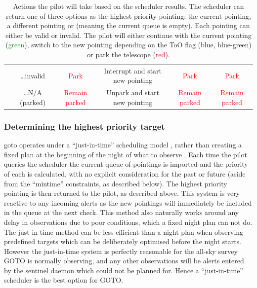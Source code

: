 \begin{colsection}
\begin{colsection}
\begin{table}
\begin{center}
\begin{tabular}{cc|cccc}
            & \ldots invalid
            & \textcolor{red}{Park}
            & \textcolor{NavyBlue}{Interrupt and start new pointing}
            & \textcolor{red}{Park}
            & \textcolor{red}{Park}
            \\[1.5cm]

            & \ldots N/A (parked)
            & \textcolor{red}{Remain parked}
            & \textcolor{NavyBlue}{Unpark and start new pointing}
            & \textcolor{red}{Remain parked}
            & \textcolor{red}{Remain parked}
            \\[0.5cm]

        \end{tabular}
    \end{center}
    \caption[Actions to take based on scheduler results]{
        Actions the pilot will take based on the scheduler results. The scheduler can return one of three options as the highest priority pointing: the current pointing, a different pointing or  (meaning the current queue is empty). Each pointing can either be valid or invalid. The pilot will either continue with the current pointing (\textcolor{ForestGreen}{green}), switch to the new pointing depending on the ToO flag (\textcolor{NavyBlue}{blue}, \textcolor{BlueGreen}{blue-green}) or park the telescope (\textcolor{red}{red}).
    }\label{tab:sched}
\end{table}


\newpage
\subsubsection{Determining the highest priority target}

\gls{goto} operates under a ``just-in-time'' scheduling model \citep[see, for example,][]{LCO_scheduling}, rather than creating a fixed plan at the beginning of the night of what to observe \citep[see, for example,][]{ZTF_scheduler}. Each time the pilot queries the scheduler the current queue of pointings is imported and the priority of each is calculated, with no explicit consideration for the past or future (aside from the ``mintime'' constraints, as described below). The highest priority pointing is then returned to the pilot, as described above. This system is very reactive to any incoming alerts as the new pointings will immediately be included in the queue at the next check. This method also naturally works around any delay in observations due to poor conditions, which a fixed night plan can not do. The just-in-time method can be less efficient than a night plan when observing predefined targets which can be deliberately optimised before the night starts. However the just-in-time system is perfectly reasonable for the all-sky survey GOTO is normally observing, and any other observations will be alerts entered by the sentinel daemon which could not be planned for. Hence a ``just-in-time'' scheduler is the best option for GOTO.\@


\end{colsection}
\end{colsection}
